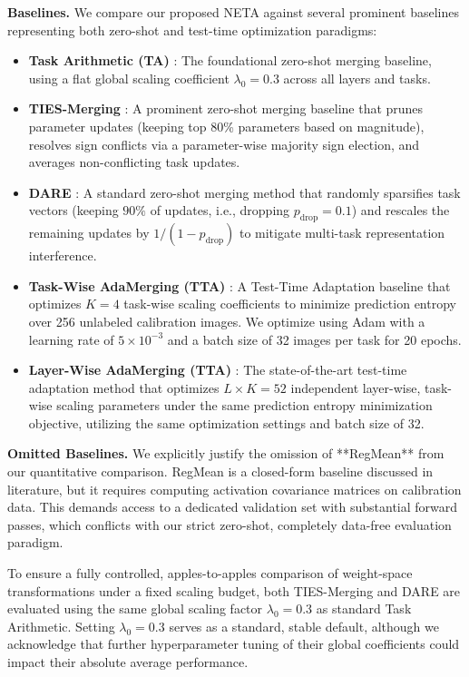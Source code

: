 \textbf{Baselines.} We compare our proposed NETA against several prominent baselines representing both zero-shot and test-time optimization paradigms:
\begin{itemize}
    \item \textbf{Task Arithmetic (TA)} \cite{ilharco2023editing}: The foundational zero-shot merging baseline, using a flat global scaling coefficient $\lambda_0 = 0.3$ across all layers and tasks.
    \item \textbf{TIES-Merging} \cite{yadav2023resolving}: A prominent zero-shot merging baseline that prunes parameter updates (keeping top 80\% parameters based on magnitude), resolves sign conflicts via a parameter-wise majority sign election, and averages non-conflicting task updates.
    \item \textbf{DARE} \cite{yu2024dare}: A standard zero-shot merging method that randomly sparsifies task vectors (keeping $90\%$ of updates, i.e., dropping $p_{\text{drop}} = 0.1$) and rescales the remaining updates by $1/(1-p_{\text{drop}})$ to mitigate multi-task representation interference.
    \item \textbf{Task-Wise AdaMerging (TTA)} \cite{yang2024adamerging}: A Test-Time Adaptation baseline that optimizes $K = 4$ task-wise scaling coefficients to minimize prediction entropy over 256 unlabeled calibration images. We optimize using Adam with a learning rate of $5 \times 10^{-3}$ and a batch size of 32 images per task for 20 epochs.
    \item \textbf{Layer-Wise AdaMerging (TTA)} \cite{yang2024adamerging}: The state-of-the-art test-time adaptation method that optimizes $L \times K = 52$ independent layer-wise, task-wise scaling parameters under the same prediction entropy minimization objective, utilizing the same optimization settings and batch size of 32.
\end{itemize}

\textbf{Omitted Baselines.} We explicitly justify the omission of **RegMean** \cite{jin2023regmean} from our quantitative comparison. RegMean is a closed-form baseline discussed in literature, but it requires computing activation covariance matrices on calibration data. This demands access to a dedicated validation set with substantial forward passes, which conflicts with our strict zero-shot, completely data-free evaluation paradigm.

To ensure a fully controlled, apples-to-apples comparison of weight-space transformations under a fixed scaling budget, both TIES-Merging and DARE are evaluated using the same global scaling factor $\lambda_0 = 0.3$ as standard Task Arithmetic. Setting $\lambda_0 = 0.3$ serves as a standard, stable default, although we acknowledge that further hyperparameter tuning of their global coefficients could impact their absolute average performance.

